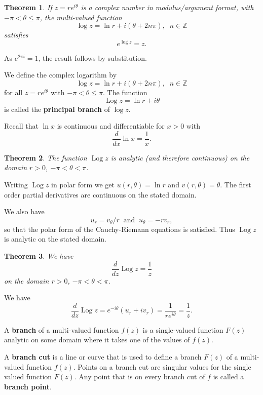 \documentclass[a4paper,10pt]{article}
\newcommand{\Z}{\mathbb{Z}}
\DeclareMathOperator{\Log}{Log}
\newtheorem{theorem}{Theorem}[section]
\newenvironment{definition}[1][Definition]{\begin{trivlist}
\item[\hskip \labelsep {\bfseries #1}]}{\end{trivlist}}
\begin{document}
\begin{theorem}
If $z = re^{i\theta}$ is a complex number in modulus/argument format, with $-\pi < \theta \leq \pi$, the multi-valued function
$$\log z = \ln r + i(\theta + 2n\pi), \;\; n \in \Z$$
satisfies
$$e^{\log z} = z.$$
\end{theorem}

As $e^{2\pi i} = 1$, the result follows by substitution.

\begin{definition}
We define the complex logarithm by
$$\log z = \ln r + i(\theta + 2n\pi), \;\; n \in \Z$$
for all $z = re^{i\theta}$ with $-\pi < \theta \leq \pi$. The function
$$\Log z = \ln r + i\theta$$
is called the \textbf{principal branch} of $\log z$.
\end{definition}

Recall that $\ln x$ is continuous and differentiable for $x > 0$ with
$$\frac{d}{dx}\ln x = \frac{1}{x}.$$

\begin{theorem}
The function $\Log z$ is analytic (and therefore continuous) on the domain $r > 0$, $-\pi < \theta < \pi$.
\end{theorem}

Writing $\Log z$ in polar form we get $u(r, \theta) = \ln r$ and $v(r, \theta) = \theta$. The first order partial derivatives are continuous on the stated domain.

We also have
$$u_r = v_\theta/r \;\;\mbox{and}\;\; u_\theta = -rv_r,$$
so that the polar form of the Cauchy-Riemann equations is satisfied. Thus $\Log z$ is analytic on the stated domain.

\begin{theorem}
We have
$$\frac{d}{dz}\Log z = \frac{1}{z}$$
on the domain $r > 0$, $-\pi < \theta < \pi$.
\end{theorem}

We have
$$\frac{d}{dz}\Log z = e^{-i\theta}(u_r + iv_r) = \frac{1}{re^{i\theta}} = \frac{1}{z}.$$

\begin{definition}
A \textbf{branch} of a multi-valued function $f(z)$ is a single-valued function $F(z)$ analytic on some domain where it takes one of the values of $f(z)$.
\end{definition}

\begin{definition}
A \textbf{branch cut} is a line or curve that is used to define a branch $F(z)$ of a multi-valued function $f(z)$. Points on a branch cut are singular values for the single valued function $F(z)$. Any point that is on every branch cut of $f$ is called a \textbf{branch point}.
\end{definition}
\end{document}
